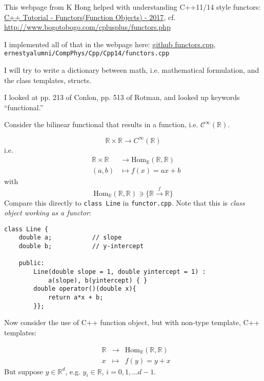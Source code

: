 \documentclass[twoside,landscape,10pt]{amsart}
\theoremstyle{plain}
\theoremstyle{definition}
\theoremstyle{remark}
\begin{document}
\begin{multicols*}{2}
This webpage from K Hong helped with understanding C++11/14 style functors: \href{http://www.bogotobogo.com/cplusplus/functors.php}{C++ Tutorial - Functors(Function Objects) - 2017}, cf. \url{http://www.bogotobogo.com/cplusplus/functors.php}

I implemented all of that in the webpage here: \href{https://github.com/ernestyalumni/CompPhys/blob/master/Cpp/Cpp14/functors.cpp}{github functors.cpp}, \verb|ernestyalumni/CompPhys/Cpp/Cpp14/functors.cpp|


I will try to write a dictionary between math, i.e. mathematical formulation, and the class templates, structs.

I looked at pp. 213 of Conlon, pp. 513 of Rotman, and looked up keywords ``functional.''

Consider the bilinear functional that results in a function, i.e. $\mathcal{C}^{\infty}(\mathbb{R})$.

\[
\mathbb{R} \times \mathbb{R} \to C^{\infty}(\mathbb{R})
\]
i.e.
\begin{equation}
\begin{aligned}
  & \mathbb{R} \times \mathbb{R} & \to \text{Hom}_{\mathbb{R}}(\mathbb{R}, \mathbb{R})   \\
  & (a,b) & \mapsto f(x) = ax + b
\end{aligned}
\end{equation}
with
\[
\text{Hom}_{\mathbb{R}}(\mathbb{R}, \mathbb{R}) \ni \lbrace \mathbb{R} \xrightarrow{f} \mathbb{R} \rbrace
\]
Compare this directly to \verb|class Line| in \verb|functor.cpp|.  Note that this is \emph{class object working as a functor}:
\begin{lstlisting}
class Line {
	double a;			// slope
	double b; 			// y-intercept
	
	public:
		Line(double slope = 1, double yintercept = 1) : 
			a(slope), b(yintercept) { } 
		double operator()(double x){
			return a*x + b;
		}};
  \end{lstlisting}
Now consider the use of C++ function object, but with non-type template, C++ templates:

\begin{equation}
\begin{aligned}
  & \mathbb{R} & \to & \text{Hom}_{\mathbb{R}}( \mathbb{R}, \mathbb{R} ) \\ 
  & x & \mapsto & f(y) = y + x 
  \end{aligned}
  \end{equation}
But suppose $y\in \mathbb{R}^d$, e.g. $y_i \in \mathbb{R}$, $i=0,1,\dots d-1$.


\end{multicols*}
\end{document}

